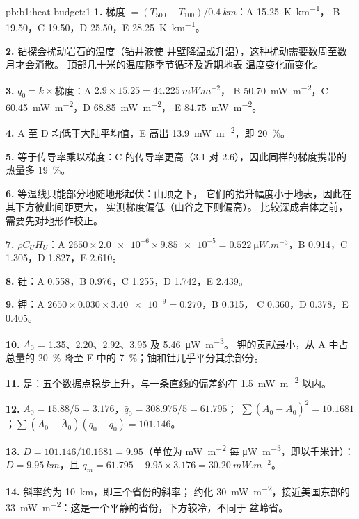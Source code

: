 \begin{solution}{pb:b1:heat-budget:1}
\textbf{1.} 梯度 $= (T_{500} - T_{100})/\qty{0.4}{km}$：A \qty{15.25}{K.km^{-1}}，
B \num{19.50}，C \num{19.50}，D \num{25.50}，E \qty{28.25}{K.km^{-1}}。

\textbf{2.} 钻探会扰动岩石的温度（钻井液使
井壁降温或升温），这种扰动需要数周至数月才会消散。
顶部几十米的温度随季节循环及近期地表
温度变化而变化。

\textbf{3.} $q_0 = k\times$梯度：A $2.9\times15.25 = \qty{44.225}{mW.m^{-2}}$，
B \qty{50.70}{mW.m^{-2}}，C \qty{60.45}{mW.m^{-2}}，D \qty{68.85}{mW.m^{-2}}，
E \qty{84.75}{mW.m^{-2}}。

\textbf{4.} A 至 D 均低于大陆平均值，E 高出
\qty{13.9}{mW.m^{-2}}，即 \qty{20}{\percent}。

\textbf{5.} 等于传导率乘以梯度：C 的传导率更高（3.1
对 2.6），因此同样的梯度携带的热量多 \qty{19}{\percent}。

\textbf{6.} 等温线只能部分地随地形起伏：山顶之下，
它们的抬升幅度小于地表，因此在其下方彼此间距更大，
实测梯度偏低（山谷之下则偏高）。
比较深成岩体之前，需要先对地形作校正。

\textbf{7.} $\rho C_U H_U$：A $2650\times\num{2.0e-6}\times\num{9.85e-5} =
\qty{0.522}{\micro W.m^{-3}}$，B 0.914，C 1.305，D 1.827，E 2.610。

\textbf{8.} 钍：A 0.558，B 0.976，C 1.255，D 1.742，E 2.439。

\textbf{9.} 钾：A $2650\times0.030\times\num{3.40e-9} = 0.270$，B 0.315，
C 0.360，D 0.378，E 0.405。

\textbf{10.} $A_0$ = 1.35、2.20、2.92、3.95 及 \qty{5.46}{\micro W.m^{-3}}。
钾的贡献最小，从 A 中占总量的 \qty{20}{\percent} 降至
E 中的 \qty{7}{\percent}；铀和钍几乎平分其余部分。

\textbf{11.} 是：五个数据点稳步上升，与一条直线的偏差约在
\qty{1.5}{mW.m^{-2}} 以内。

\textbf{12.} $\bar A_0 = 15.88/5 = 3.176$，$\bar q_0 = 308.975/5 = 61.795$；
$\sum(A_0 - \bar A_0)^2 = 10.1681$；$\sum(A_0 - \bar A_0)(q_0 - \bar q_0) =
101.146$。

\textbf{13.} $D = 101.146/10.1681 = 9.95$（单位为 \unit{mW.m^{-2}} 每
\unit{\micro W.m^{-3}}，即以千米计）：$D = \qty{9.95}{km}$，且 $q_m = 61.795 -
9.95\times3.176 = \qty{30.20}{mW.m^{-2}}$。

\textbf{14.} 斜率约为 \qty{10}{km}，即三个省份的斜率；
约化 \qty{30}{mW.m^{-2}}，接近美国东部的
\qty{33}{mW.m^{-2}}：这是一个平静的省份，下方较冷，不同于
盆岭省。


\end{solution}
